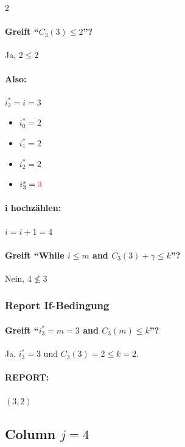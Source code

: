 \begin{multicols}{2}
    \paragraph{Greift ``$C_3(3)\le 2$''?} Ja, $2 \leq 2$
    \paragraph{Also:} $i^*_3 = i = 3$
    \columnbreak
    \begin{itemize}
        \item $i_0^\ast = 2$
        \item $i_1^\ast = 2 $
        \item $i_2^\ast = 2 $
        \item $i_3^\ast = \textcolor{red}{3} $
    \end{itemize}
\end{multicols}

\paragraph{i hochzählen:} $i = i + 1 = 4$

\paragraph{Greift ``While $i \leq m$ and $C_3(3) + \gamma \leq k$''?} Nein, $4 \not\leq 3$

\subsubsection*{Report If-Bedingung}

\paragraph{Greift ``$i^*_3 = m = 3$ and $C_3(m) \leq k$''?} Ja, $i^*_3 = 3$ und $C_3(3) = 2 \leq k = 2$.

\paragraph{REPORT:} $(3, 2)$

\newpage



\subsection*{Column $j = 4$}

